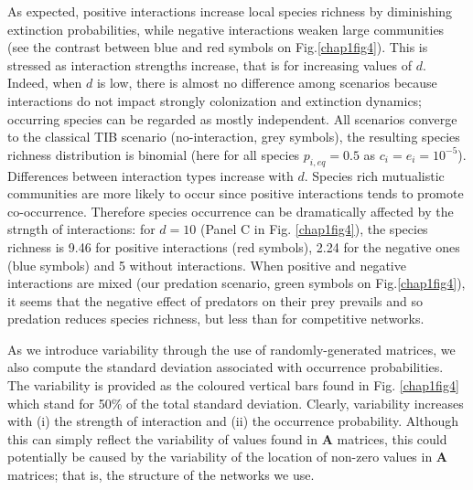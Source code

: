 As expected, positive interactions increase local species richness by diminishing extinction probabilities, while negative interactions weaken large communities (see the contrast between blue and red symbols on Fig.\ref{chap1fig4}). This is stressed as interaction strengths increase, that is for increasing values of $d$. Indeed, when $d$ is low, there is almost no difference among scenarios because interactions do not impact strongly colonization and extinction dynamics; occurring species can be regarded as mostly independent. All scenarios converge to the classical TIB scenario (no-interaction, grey symbols), the resulting species richness distribution is binomial (here for all species $p_{i,eq}=0.5$ as $c_i=e_i=10^{-5}$). Differences between interaction types increase with $d$. Species rich mutualistic communities are more likely to occur since positive interactions tends to promote co-occurrence. Therefore species occurrence can be dramatically affected by the strngth of interactions: for $d=10$ (Panel C in Fig. \ref{chap1fig4}), the species richness is 9.46 for positive interactions (red symbols), 2.24 for the negative ones (blue symbols) and 5 without interactions. When positive and negative interactions are mixed (our predation scenario, green symbols on Fig.\ref{chap1fig4}), it seems that the negative effect of predators on their prey prevails and so predation reduces species richness, but less than for competitive networks.

As we introduce variability through the use of randomly-generated matrices, we also compute the standard deviation associated with occurrence probabilities. The variability is provided as the coloured vertical bars found in Fig. \ref{chap1fig4} which stand for 50\% of the total standard deviation. Clearly, variability increases with (i) the strength of interaction and (ii) the occurrence probability. Although this can simply reflect the variability of values found in $\mathbf{A}$ matrices, this could potentially be caused by the variability of the location of non-zero values in  $\mathbf{A}$ matrices; that is, the structure of the networks we use.

